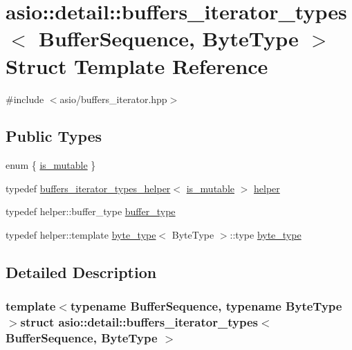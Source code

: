 \hypertarget{structasio_1_1detail_1_1buffers__iterator__types}{}\section{asio\+:\+:detail\+:\+:buffers\+\_\+iterator\+\_\+types$<$ Buffer\+Sequence, Byte\+Type $>$ Struct Template Reference}
\label{structasio_1_1detail_1_1buffers__iterator__types}


{\ttfamily \#include $<$asio/buffers\+\_\+iterator.\+hpp$>$}

\subsection*{Public Types}
\begin{DoxyCompactItemize}
\item 
enum \{ \hyperlink{structasio_1_1detail_1_1buffers__iterator__types_a4dd87513c54e420b5fcb7d32d9b83066acc55882f3dd7c16702dc2dbc6e626583}{is\+\_\+mutable}
 \}
\item 
typedef \hyperlink{structasio_1_1detail_1_1buffers__iterator__types__helper}{buffers\+\_\+iterator\+\_\+types\+\_\+helper}$<$ \hyperlink{structasio_1_1detail_1_1buffers__iterator__types_a4dd87513c54e420b5fcb7d32d9b83066acc55882f3dd7c16702dc2dbc6e626583}{is\+\_\+mutable} $>$ \hyperlink{structasio_1_1detail_1_1buffers__iterator__types_ae6a5428132b9db89770ce9bea21a970b}{helper}
\item 
typedef helper\+::buffer\+\_\+type \hyperlink{structasio_1_1detail_1_1buffers__iterator__types_a7aa8572359d0a382a741a69ca1d46e22}{buffer\+\_\+type}
\item 
typedef helper\+::template \hyperlink{structasio_1_1detail_1_1buffers__iterator__types_a1e923f24ebb373133ae1c54a816fce3e}{byte\+\_\+type}$<$ Byte\+Type $>$\+::type \hyperlink{structasio_1_1detail_1_1buffers__iterator__types_a1e923f24ebb373133ae1c54a816fce3e}{byte\+\_\+type}
\end{DoxyCompactItemize}


\subsection{Detailed Description}
\subsubsection*{template$<$typename Buffer\+Sequence, typename Byte\+Type$>$struct asio\+::detail\+::buffers\+\_\+iterator\+\_\+types$<$ Buffer\+Sequence, Byte\+Type $>$}



